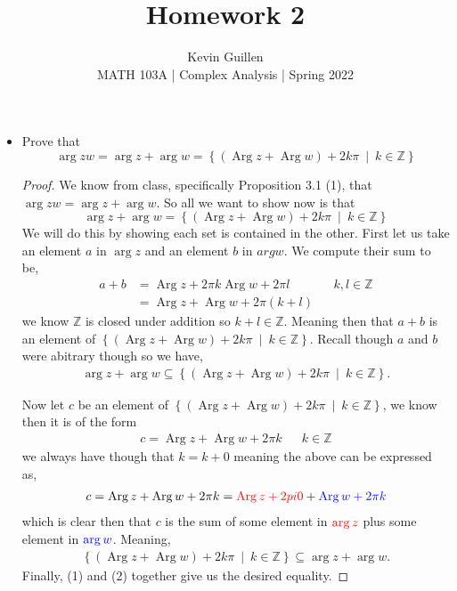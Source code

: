 \documentclass[11pt]{article}
\newenvironment{problem}[2][Problem\!]{\begin{trivlist}
\item[\hskip \labelsep {\bfseries #1}\hskip \labelsep {\bfseries #2}]}{\end{trivlist}}
\newcommand{\zz}{\mathbb Z}   %
\newcommand{\setp}[2]{\left\{#1\ \middle|\ #2\right\}} %
\newcommand{\parg}{\operatorname{Arg}}
\newcommand{\tcr}[1]{\textcolor{red}{#1}}
\newcommand{\tcb}[1]{\textcolor{blue}{#1}}
\begin{document}
 
\title{Homework 2}
\author{Kevin Guillen\\[0.5em]
MATH 103A  | Complex Analysis | Spring 2022}
\date{} 
\maketitle


\begin{problem}{2.1}\hfill
\begin{itemize}[itemsep=3em]
\item[(a)] Prove that 
\[\arg zw = \arg z + \arg w = \setp{(\parg z + \parg w) + 2k\pi}{k \in \zz}\]
\begin{example}
    \begin{proof}
        We know from class, specifically Proposition 3.1 (1), that $\arg zw = \arg z + \arg w $. So all we want to show now is that 
        \[\arg z + \arg w = \setp{(\parg z + \parg w) + 2k\pi}{k \in \zz}\]
        We will do this by showing each set is contained in the other. First let us take an element $a$ in $\arg z$ and an element $b$ in $arg w$. We compute their sum to be,
        \begin{align*}
            a + b &= \parg z + 2\pi k\parg w + 2\pi l && k,l \in \zz \\
            &= \parg z + \parg w + 2\pi(k + l)
        \end{align*}
        we know $\zz$ is closed under addition so $k+l \in \zz$. Meaning then that $a+b$ is an element of $\setp{(\parg z + \parg w) + 2k\pi}{k \in \zz}$. Recall though $a$ and $b$ were abitrary though so we have, 
        \begin{align}\arg z + \arg w \subseteq \setp{(\parg z + \parg w) + 2k\pi}{k \in \zz}.
        \end{align}

        Now let $c$ be an element of $\setp{(\parg z + \parg w) + 2k\pi}{k \in \zz}$, we know then it is of the form
        \begin{align*}
            c = \parg z + \parg w + 2\pi k && k \in \zz 
        \end{align*}
        we always have though that $k = k + 0$ meaning the above can be expressed as,
        \begin{align*}
            c = \parg z + \parg w + 2\pi k = \tcr{\parg z + 2pi 0} + \tcb{\parg w + 2\pi k}
        \end{align*}
        which is clear then that $c$ is the sum of some element in $\tcr{\arg z}$ plus some element in $\tcb{\arg w}$. Meaning,
        \begin{align}
            \setp{(\parg z + \parg w) + 2k\pi}{k \in \zz} \subseteq \arg z + \arg w.
        \end{align}
        Finally, (1) and (2) together give us the desired equality. 
    \end{proof}
\end{example}
\newpage


\end{itemize}
\end{problem}
\end{document}
